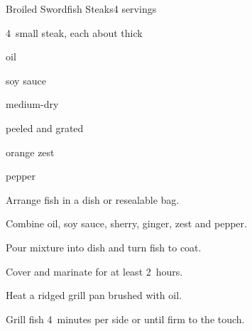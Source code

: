 \begin{recipe}{Broiled Swordfish Steaks}{}{4 servings}

\begin{ingredients}
\item 4~small  steak, each about \inch{\threequarter} thick
\item \C{\half} oil
\item {} soy sauce
\item {} medium-dry 
\item \tp{1\half} peeled and grated 
\item {} orange zest
\item pepper
\end{ingredients}

\begin{directions}
\item Arrange fish in a dish or resealable bag.
\item Combine oil, soy sauce, sherry, ginger, zest and pepper.
\item Pour mixture into dish and turn fish to coat.
\item Cover and marinate for at least 2~hours.
\item Heat a ridged grill pan brushed with oil.
\item Grill fish 4~minutes per side or until firm to the touch.
\end{directions}

\end{recipe}
